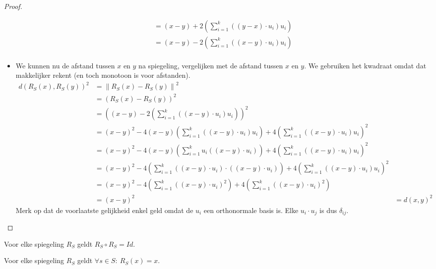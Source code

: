 \documentclass[main.tex]{subfiles}
\begin{document}
\begin{st}
\begin{proof}
\begin{itemize}
\[\begin{array}{rll}
                           &= (x-y) + 2\left(\sum_{i=1}^{k}((y-x)\cdot u_{i} )u_{i}\right) &\\
                           &= (x-y) - 2\left(\sum_{i=1}^{k}((x-y)\cdot u_{i} )u_{i}\right) &\\
      \end{array}
      \]
    \item We kunnen nu de afstand tussen $x$ en $y$ na spiegeling, vergelijken met de afstand tussen $x$ en $y$.
      We gebruiken het kwadraat omdat dat makkelijker rekent (en toch monotoon is voor afstanden).
      \[
      \begin{array}{rll}
        d(R_{S}(x),R_{S}(y))^{2} &= \left\| R_{S}(x) - R_{S}(y)\right\|^{2} & \\
                            &= (R_{S}(x) - R_{S}(y))^{2} &\\
                            &= \left((x-y) - 2\left(\sum_{i=1}^{k}((x-y)\cdot u_{i} )u_{i}\right)\right)^{2} &\\
                            &= (x-y)^{2} -4(x-y)\left(\sum_{i=1}^{k}((x-y)\cdot u_{i} )u_{i}\right) + 4\left(\sum_{i=1}^{k}((x-y)\cdot u_{i} )u_{i}\right)^{2} &\\
                            &= (x-y)^{2} -4(x-y)\left(\sum_{i=1}^{k}u_{i}((x-y)\cdot u_{i} )\right) + 4\left(\sum_{i=1}^{k}((x-y)\cdot u_{i} )u_{i}\right)^{2} &\\
                            &= (x-y)^{2} -4\left(\sum_{i=1}^{k}((x-y) \cdot u_{i})\cdot((x-y)\cdot u_{i} )\right) + 4\left(\sum_{i=1}^{k}((x-y)\cdot u_{i} )u_{i}\right)^{2} &\\
                            &= (x-y)^{2} -4\left(\sum_{i=1}^{k}((x-y)\cdot u_{i} )^{2}\right) + 4\left(\sum_{i=1}^{k}((x-y)\cdot u_{i} )^{2}\right) &\\
                            &= (x-y)^{2} &= d(x,y)^{2}
      \end{array}
      \]
      Merk op dat de voorlaatste gelijkheid enkel geld omdat de $u_{i}$ een orthonormale basis is.
      Elke $u_{i}\cdot u_{j}$ is dus $\delta_{ij}$.
      
    \end{itemize}
  \end{proof}
\end{st}

\begin{st}
  Voor elke spiegeling $R_{S}$ geldt $R_{S} \circ R_{S} = Id$.
\end{st}

\begin{st}
  Voor elke spiegeling $R_{S}$ geldt $\forall s \in S:\ R_{S}(x) = x$.
\end{st}
\end{document}
